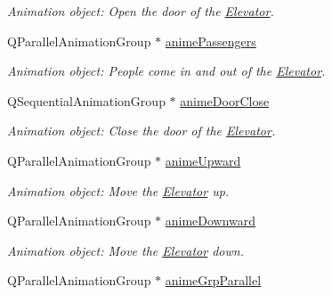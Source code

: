 \begin{DoxyCompactItemize}
\begin{DoxyCompactList}\small\item\em Animation object: Open the door of the \hyperlink{class_elevator}{Elevator}. \end{DoxyCompactList}\item 
\hypertarget{class_elevator_ac46d5a0a1fb9094138d771cfb1d5e632}{
QParallelAnimationGroup $\ast$ \hyperlink{class_elevator_ac46d5a0a1fb9094138d771cfb1d5e632}{animePassengers}}
\label{class_elevator_ac46d5a0a1fb9094138d771cfb1d5e632}

\begin{DoxyCompactList}\small\item\em Animation object: People come in and out of the \hyperlink{class_elevator}{Elevator}. \end{DoxyCompactList}\item 
\hypertarget{class_elevator_a34b7927963bedf4ba7727e83e53706cb}{
QSequentialAnimationGroup $\ast$ \hyperlink{class_elevator_a34b7927963bedf4ba7727e83e53706cb}{animeDoorClose}}
\label{class_elevator_a34b7927963bedf4ba7727e83e53706cb}

\begin{DoxyCompactList}\small\item\em Animation object: Close the door of the \hyperlink{class_elevator}{Elevator}. \end{DoxyCompactList}\item 
\hypertarget{class_elevator_a3fece615cc6c5f0123d4731021ae683a}{
QParallelAnimationGroup $\ast$ \hyperlink{class_elevator_a3fece615cc6c5f0123d4731021ae683a}{animeUpward}}
\label{class_elevator_a3fece615cc6c5f0123d4731021ae683a}

\begin{DoxyCompactList}\small\item\em Animation object: Move the \hyperlink{class_elevator}{Elevator} up. \end{DoxyCompactList}\item 
\hypertarget{class_elevator_af14b33b5234414d0c90a8328f9b0fffa}{
QParallelAnimationGroup $\ast$ \hyperlink{class_elevator_af14b33b5234414d0c90a8328f9b0fffa}{animeDownward}}
\label{class_elevator_af14b33b5234414d0c90a8328f9b0fffa}

\begin{DoxyCompactList}\small\item\em Animation object: Move the \hyperlink{class_elevator}{Elevator} down. \end{DoxyCompactList}\item 
\hypertarget{class_elevator_a1f9815d1977acf5312fe26a6311e0818}{
QParallelAnimationGroup $\ast$ \hyperlink{class_elevator_a1f9815d1977acf5312fe26a6311e0818}{animeGrpParallel}}
\label{class_elevator_a1f9815d1977acf5312fe26a6311e0818}


\end{DoxyCompactItemize}
